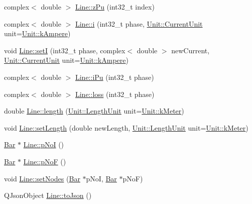 \begin{DoxyCompactItemize}
\item 
complex$<$ double $>$ \hyperlink{group___models_ga139698332327a712f6c02d96fe73fbee}{Line\+::z\+Pu} (int32\+\_\+t index)
\item 
complex$<$ double $>$ \hyperlink{group___models_gaf81e7055102816465bdf7e19afc2d547}{Line\+::i} (int32\+\_\+t phase, \hyperlink{class_unit_a0794cf6c9682f48296dd4a5315389787}{Unit\+::\+Current\+Unit} unit=\hyperlink{class_unit_a0794cf6c9682f48296dd4a5315389787a368a3c470f0b590a6100dda717a7dd4f}{Unit\+::k\+Ampere})
\item 
void \hyperlink{group___models_ga9e55b06dc3e385838fdd13d5580438ef}{Line\+::set\+I} (int32\+\_\+t phase, complex$<$ double $>$ new\+Current, \hyperlink{class_unit_a0794cf6c9682f48296dd4a5315389787}{Unit\+::\+Current\+Unit} unit=\hyperlink{class_unit_a0794cf6c9682f48296dd4a5315389787a368a3c470f0b590a6100dda717a7dd4f}{Unit\+::k\+Ampere})
\item 
complex$<$ double $>$ \hyperlink{group___models_ga8f71e477800134586652d283087ed373}{Line\+::i\+Pu} (int32\+\_\+t phase)
\item 
complex$<$ double $>$ \hyperlink{group___models_ga84ddf17bee846a6f21c44d463252dd25}{Line\+::loss} (int32\+\_\+t phase)
\item 
double \hyperlink{group___models_gae2e4500d0fa60dcc2ecb08b2c96954f9}{Line\+::length} (\hyperlink{class_unit_a8c8921f7b225ad6063b1cb573425b9a0}{Unit\+::\+Length\+Unit} unit=\hyperlink{class_unit_a8c8921f7b225ad6063b1cb573425b9a0abfa41ebe7ee649a1f02c9b8ae570434b}{Unit\+::k\+Meter})
\item 
void \hyperlink{group___models_ga950d0b8f5d167eda430c65ca7adadbb0}{Line\+::set\+Length} (double new\+Length, \hyperlink{class_unit_a8c8921f7b225ad6063b1cb573425b9a0}{Unit\+::\+Length\+Unit} unit=\hyperlink{class_unit_a8c8921f7b225ad6063b1cb573425b9a0abfa41ebe7ee649a1f02c9b8ae570434b}{Unit\+::k\+Meter})
\item 
\hyperlink{class_bar}{Bar} $\ast$ \hyperlink{group___models_gaeafd90e84ac2f8de2a879abe9e53eef3}{Line\+::p\+No\+I} ()
\item 
\hyperlink{class_bar}{Bar} $\ast$ \hyperlink{group___models_gabbc73ddedd3075c33ae5331bd7c9829f}{Line\+::p\+No\+F} ()
\item 
void \hyperlink{group___models_gaeeab146e6c1d7d1a688a2764a9c9a170}{Line\+::set\+Nodes} (\hyperlink{class_bar}{Bar} $\ast$p\+No\+I, \hyperlink{class_bar}{Bar} $\ast$p\+No\+F)
\item 
Q\+Json\+Object \hyperlink{group___models_ga4effa7a96db465ea6e01135d5a010739}{Line\+::to\+Json} ()

\end{DoxyCompactItemize}
